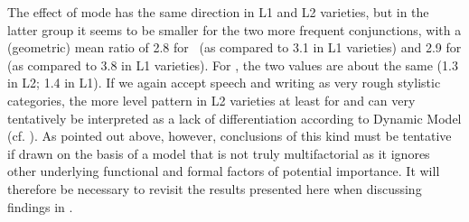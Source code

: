 The effect of mode has the same direction in L1 and L2 varieties, but in the latter group it seems to be smaller for the two more frequent conjunctions, with a (geometric) mean ratio of 2.8 for ~(as compared to 3.1 in L1 varieties) and 2.9 for  (as compared to 3.8 in L1 varieties). For , the two values are about the same (1.3 in L2; 1.4 in L1). If we again accept speech and writing as very rough stylistic categories, the more level pattern in L2 varieties at least for  and  can very tentatively be interpreted as a lack of differentiation according to  Dynamic Model (cf. ). As pointed out above, however, conclusions of this kind must be tentative if drawn on the basis of a model that is not truly multifactorial as it ignores other underlying functional and formal factors of potential importance. It will therefore be necessary to revisit the results presented here when discussing findings in .

